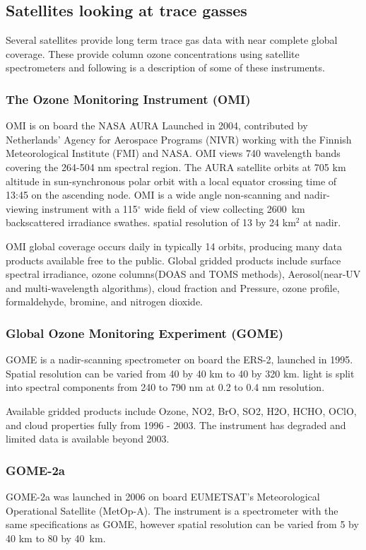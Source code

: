 \subsection{Satellites looking at trace gasses}
Several satellites provide long term trace gas data with near complete global coverage. These provide column ozone concentrations using satellite spectrometers and following is a description of some of these instruments.

\subsubsection{The Ozone Monitoring Instrument (OMI)}
OMI is on board the NASA AURA Launched in 2004, contributed by Netherlands' Agency for Aerospace Programs (NIVR) working with the Finnish Meteorological Institute (FMI) and NASA. OMI views 740 wavelength bands covering the 264-504 nm spectral region.
The AURA satellite orbits at 705 km altitude in sun-synchronous polar orbit with a local equator crossing time of 13:45 on the ascending node.
OMI is a wide angle non-scanning and nadir-viewing instrument with a 115$^{\circ}$ wide field of view collecting 2600~km backscattered irradiance swathes. spatial resolution of 13 by 24 km$^2$ at nadir. 

OMI global coverage occurs daily in typically 14 orbits, producing many data products available free to the public.
Global gridded products include surface spectral irradiance, ozone columns(DOAS and TOMS methods), Aerosol(near-UV and multi-wavelength algorithms), cloud fraction and Pressure, ozone profile, formaldehyde, bromine, and nitrogen dioxide.

\subsubsection{Global Ozone Monitoring Experiment (GOME)}

GOME is a nadir-scanning spectrometer on board the ERS-2, launched in 1995.
Spatial resolution can be varied from 40 by 40 km to 40 by 320 km.
light is split into spectral components from 240 to 790 nm at 0.2 to 0.4 nm resolution.

Available gridded products include Ozone, NO2, BrO, SO2, H2O, HCHO, OClO, and cloud properties fully from 1996 - 2003. The instrument has degraded and limited data is available beyond 2003. 

\subsubsection{GOME-2a}
GOME-2a was launched in 2006 on board EUMETSAT's Meteorological Operational Satellite (MetOp-A). 
The instrument is a spectrometer with the same specifications as GOME, however spatial resolution can be varied from 5 by 40 km to 80 by 40~km.

